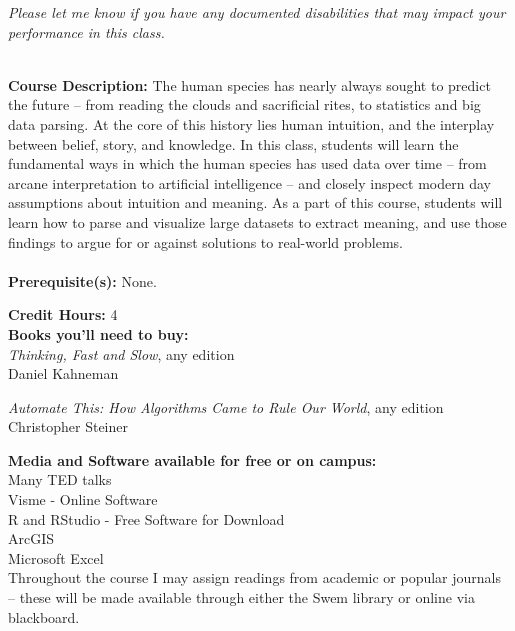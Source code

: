 \documentclass[11pt]{article}
\begin{document}
\textit{Please let me know if you have any documented disabilities that may impact your performance in this class.}

\textbf {\large \\ Course Description:} The human species has nearly always sought to predict the future – from reading the clouds and sacrificial rites, to statistics and big data parsing. At the core of this history lies human intuition, and the interplay between belief, story, and knowledge. In this class, students will learn the fundamental ways in which the human species has used data over time – from arcane interpretation to artificial intelligence – and closely inspect modern day assumptions about intuition and meaning. As a part of this course, students will learn how to parse and visualize large datasets to extract meaning, and use those findings to argue for or against solutions to real-world problems. \\
\\
\textbf {Prerequisite(s):} None.

\textbf {Credit Hours:} 4 \\

\textbf {\large Books you'll need to buy:}\\ \emph{Thinking, Fast and Slow}, any edition \\
Daniel Kahneman 
\vspace{2mm}

\emph{Automate This: How Algorithms Came to Rule Our World}, any edition \\
Christopher Steiner
\vspace{2mm}

\textbf {\large Media and Software available for free or on campus:}\\

Many TED talks\\
Visme - Online Software\\
R and RStudio - Free Software for Download\\
ArcGIS\\
Microsoft Excel\\

Throughout the course I may assign readings from academic or popular journals – these will be made available through either the Swem library or online via blackboard.

\vspace{8mm}
\end{document}

